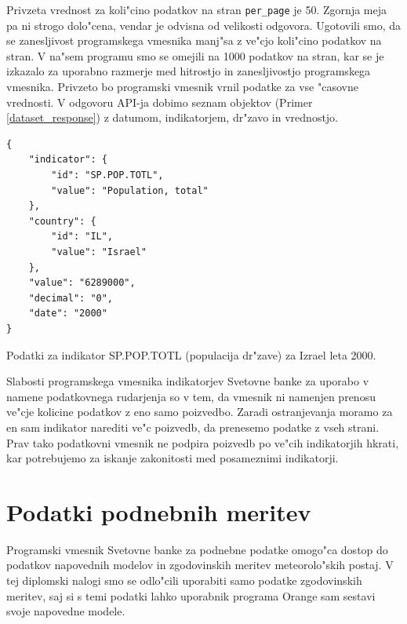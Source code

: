 
Privzeta vrednost za koli"cino podatkov na stran \verb|per_page| je 50. 
Zgornja meja pa ni strogo dolo"cena, vendar je odvisna od velikosti odgovora. 
Ugotovili smo, da se zanesljivost programskega vmesnika manj"sa z ve"cjo 
koli"cino podatkov na stran. V na"sem programu smo se omejili na 1000 podatkov
na stran, kar se je izkazalo za uporabno razmerje med hitrostjo in 
zanesljivostjo programskega vmesnika. Privzeto bo programski vmesnik vrnil 
podatke za vse "casovne vrednosti. V odgovoru API-ja dobimo seznam objektov 
(Primer \ref{dataset_response}) z datumom, indikatorjem, dr"zavo in vrednostjo.

\begin{snippet}
\begin{center}
\begin{lstlisting}
{
    "indicator": {
        "id": "SP.POP.TOTL",
        "value": "Population, total"
    },
    "country": {
        "id": "IL",
        "value": "Israel"
    },
    "value": "6289000",
    "decimal": "0",
    "date": "2000"
}
\end{lstlisting}
\end{center}
\caption{Podatki za indikator SP.POP.TOTL (populacija dr"zave) za Izrael leta
2000.}
\label{dataset_response}
\end{snippet} 

Slabosti programskega vmesnika indikatorjev Svetovne banke za uporabo v namene
podatkovnega rudarjenja so v tem, da vmesnik ni namenjen prenosu ve"cje 
kolicine podatkov z eno samo poizvedbo. Zaradi ostranjevanja moramo za en sam 
indikator narediti ve"c poizvedb, da prenesemo podatke z vseh strani. Prav 
tako podatkovni vmesnik ne podpira poizvedb po ve"cih indikatorjih hkrati, kar
potrebujemo za iskanje zakonitosti med posameznimi indikatorji.

\section{Podatki podnebnih meritev}

Programski vmesnik Svetovne banke za podnebne podatke omogo"ca dostop do 
podatkov napovednih modelov in zgodovinskih meritev meteorolo"skih postaj. V tej 
diplomski nalogi smo se odlo"cili uporabiti samo podatke zgodovinskih meritev, 
saj si s temi podatki lahko uporabnik programa Orange sam sestavi svoje 
napovedne modele.

